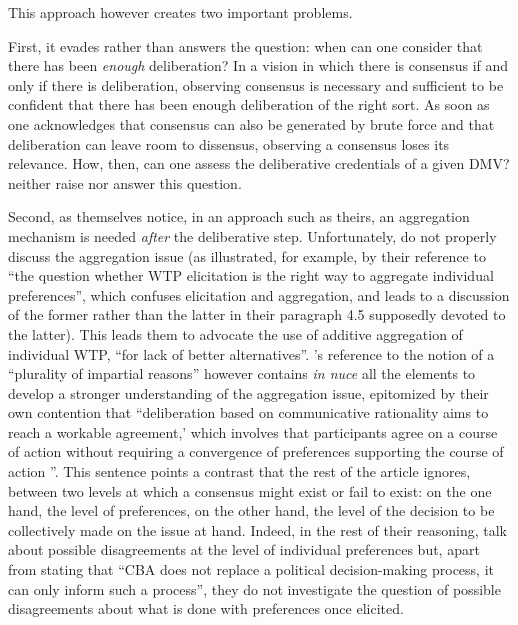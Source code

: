 \documentclass[version=3.21, pagesize, twoside=off, bibliography=totoc, DIV=calc, fontsize=12pt, a4paper, french, english]{scrartcl}
\begin{document}
This approach however creates two important problems.

First, it evades rather than answers the question: when can one consider that there has been \emph{enough} deliberation? In a vision in which there is consensus if and only if there is deliberation, observing consensus is necessary and sufficient to be confident that there has been enough deliberation of the right sort. As soon as one acknowledges that consensus can also be generated by brute force and that deliberation can leave room to dissensus, observing a consensus loses its relevance. How, then, can one assess the deliberative credentials of a given DMV? \citet{bartkowski_beyond_2018}  neither raise nor answer this question.

Second, as \citet{bartkowski_beyond_2018} themselves notice, in an approach such as theirs, an aggregation mechanism is needed \emph{after} the deliberative step. Unfortunately, \citet{bartkowski_beyond_2018} do not properly discuss the aggregation issue (as illustrated, for example, by their reference to ``the question whether WTP elicitation is the right way to aggregate individual preferences'', which confuses elicitation and aggregation, and leads to a discussion of the former rather than the latter in their paragraph 4.5   supposedly devoted to the latter). This leads them to advocate the use of additive aggregation of individual WTP, ``for lack of better alternatives''. \citet{bartkowski_beyond_2018}'s reference to the notion of a ``plurality of impartial reasons'' however contains \emph{in nuce} all the elements to develop a stronger understanding of the aggregation issue, epitomized by their own contention that ``deliberation based on communicative rationality aims to reach a workable agreement,’   which involves that participants agree on a course of action without requiring a convergence of preferences supporting the course of action \citep{dryzek_deliberative_2002}''. This sentence points a contrast that the rest of the article ignores, between two levels at which a consensus might exist or fail to exist: on the one hand, the level of preferences, on the other hand, the level of the decision to be collectively made on the issue at hand. Indeed, in the rest of their reasoning, \citet{bartkowski_beyond_2018} talk about possible disagreements at the level of individual preferences but, apart from stating that ``CBA  does not replace a political decision-making process, it can only inform such a process'', they do not investigate the question of possible disagreements about what is done with preferences once elicited.  
\end{document}
